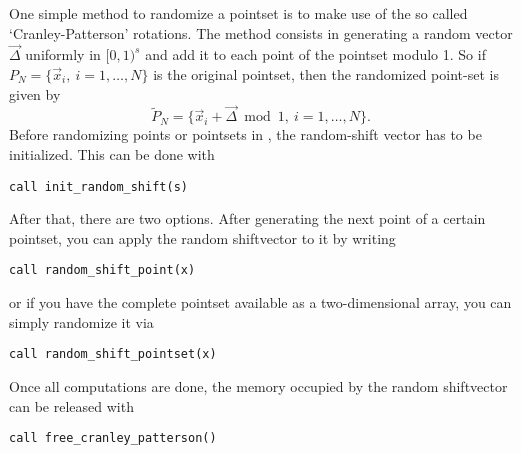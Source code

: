 One simple method to randomize a pointset is to make use of the so called
`Cranley-Patterson' rotations.  The method consists in generating a random
vector $\vec{\Delta}$ uniformly in $[0,1)^s$ and add it to each point of the
pointset modulo 1.  So if $P_N = \{\vec{x}_i,\ i=1,\dots,N\}$ is the original
pointset, then the randomized point-set is given by
\[
\tilde{P}_N = \{ \vec{x}_i + \vec{\Delta} \bmod 1,\ i=1,\ldots,N\}.
\]
Before randomizing points or pointsets in \qmcpack{}, the random-shift vector
has to be initialized.  This can be done with
\begin{lstlisting}
call init_random_shift(s)
\end{lstlisting}
After that, there are two options.  After generating the next point of a
certain pointset, you can apply the random shiftvector to it by writing
\begin{lstlisting}
call random_shift_point(x)
\end{lstlisting}
or if you have the complete pointset available as a two-dimensional array, you
can simply randomize it via
\begin{lstlisting}
call random_shift_pointset(x)
\end{lstlisting}
Once all computations are done, the memory occupied by the random shiftvector
can be released with
\begin{lstlisting}
call free_cranley_patterson()
\end{lstlisting}
